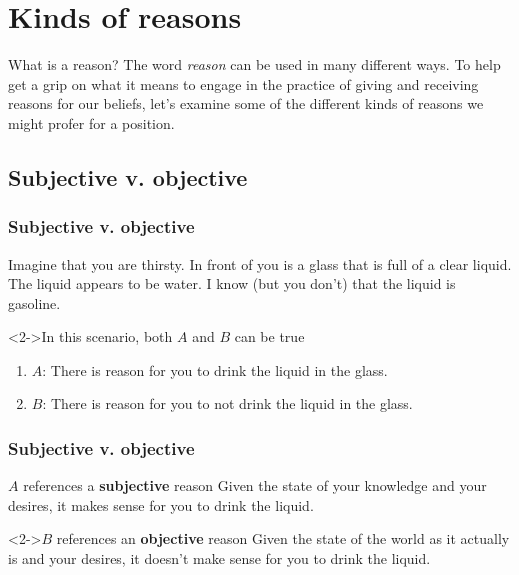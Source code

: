 \documentclass[10pt,letterpaper,xcolor=dvipsnames,handout]{beamer}
\begin{document}
\section{Kinds of reasons}

\begin{frame}{What is a reason?}
  The word \textit{reason} can be used in many different ways.  To help get a grip on what it means to engage in the practice of giving and receiving reasons for our beliefs, let's examine some of the different kinds of reasons we might profer for a position.
\end{frame}

\subsection{Subjective v. objective}

\begin{frame}
\frametitle{Subjective v. objective}

Imagine that you are thirsty.  In front of you is a glass that is full of a clear liquid.  The liquid appears to be water. I know (but you don't) that the liquid is gasoline.

\begin{block}<2->{In this scenario, both $A$ and $B$ can be true}
  \begin{enumerate}[$\rightharpoonup$]
    \item $A$: There is reason for you to drink the liquid in the glass.
    \item $B$: There is reason for you to not drink the liquid in the glass.
  \end{enumerate}
\end{block}

\end{frame}

\begin{frame}
\frametitle{Subjective v. objective}

\begin{block}{$A$ references a \textbf{subjective} reason}
  Given the state of your knowledge and your desires, it makes sense for you to drink the liquid.
\end{block}

\begin{block}<2->{$B$ references an \textbf{objective} reason}
  Given the state of the world as it actually is and your desires, it doesn't make sense for you to drink the liquid.
\end{block}


\end{frame}
\end{document}
